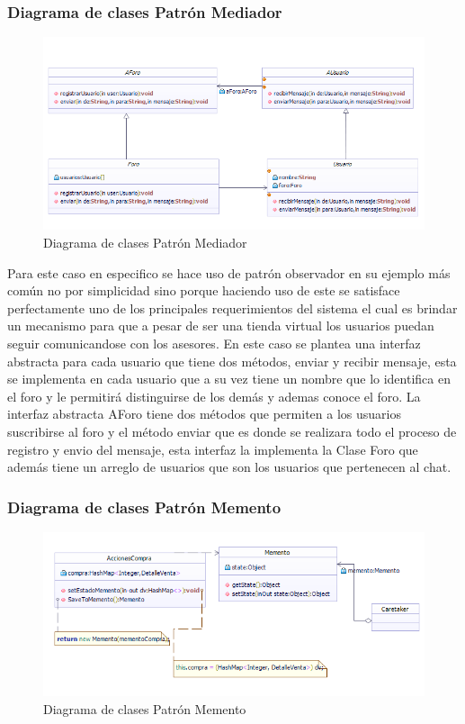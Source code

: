\subsubsection*{Diagrama de clases Patrón Mediador}

\begin{figure}[th!]
	\centering
	\includegraphics[width=1\linewidth]{arquitectura/imagenes/DiagramaMediator}
	\caption{Diagrama de clases Patrón Mediador}
\end{figure}

Para este caso en especifico se hace uso de patrón observador en su ejemplo más común no por simplicidad sino porque haciendo uso de este se satisface perfectamente uno de los principales requerimientos del sistema el cual es brindar un mecanismo para que a pesar de ser una tienda virtual los usuarios puedan seguir comunicandose con los asesores. \newline
En este caso se plantea una interfaz abstracta para cada usuario que tiene dos métodos, enviar y recibir mensaje, esta se implementa en cada usuario que a su vez tiene un nombre que lo identifica en el foro y le permitirá distinguirse de los demás y ademas conoce el foro. La interfaz abstracta AForo tiene dos métodos que permiten a los usuarios suscribirse al foro y el método enviar que es donde se realizara todo el proceso de registro y envio del mensaje, esta interfaz la implementa la Clase Foro que además tiene un arreglo de usuarios que son los usuarios que pertenecen al chat.

\subsubsection{Diagrama de clases Patrón Memento}
\begin{figure}[h!]
	\centering
	\includegraphics[width=0.7\linewidth]{arquitectura/imagenes/PatronMementoCasoEstudio}
	\caption{Diagrama de clases Patrón Memento}

\end{figure}

